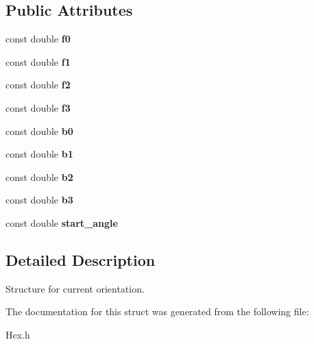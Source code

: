 \subsection*{Public Attributes}
\begin{DoxyCompactItemize}
\item 
const double {\bfseries f0}\hypertarget{structOrientation_a6c479a9d50fc45541efd9f6c4a1d8292}{}\label{structOrientation_a6c479a9d50fc45541efd9f6c4a1d8292}

\item 
const double {\bfseries f1}\hypertarget{structOrientation_adc042593ae940380549d3daab099f47f}{}\label{structOrientation_adc042593ae940380549d3daab099f47f}

\item 
const double {\bfseries f2}\hypertarget{structOrientation_ab1d8393081530c13b5b9f8abbb74bcf1}{}\label{structOrientation_ab1d8393081530c13b5b9f8abbb74bcf1}

\item 
const double {\bfseries f3}\hypertarget{structOrientation_a3bad5d4cb5d8ad5bf831e0da4e9a5393}{}\label{structOrientation_a3bad5d4cb5d8ad5bf831e0da4e9a5393}

\item 
const double {\bfseries b0}\hypertarget{structOrientation_a00fa64524c85e578242ff570ec1af296}{}\label{structOrientation_a00fa64524c85e578242ff570ec1af296}

\item 
const double {\bfseries b1}\hypertarget{structOrientation_a6a689412f9364145e76915cf22e09e23}{}\label{structOrientation_a6a689412f9364145e76915cf22e09e23}

\item 
const double {\bfseries b2}\hypertarget{structOrientation_a6a7dc6148e4aa540e911941ad84d3860}{}\label{structOrientation_a6a7dc6148e4aa540e911941ad84d3860}

\item 
const double {\bfseries b3}\hypertarget{structOrientation_a542a63f9305a118e4bde11b9793da46b}{}\label{structOrientation_a542a63f9305a118e4bde11b9793da46b}

\item 
const double {\bfseries start\+\_\+angle}\hypertarget{structOrientation_ab5d081ee42e1b109e123a836fb85c383}{}\label{structOrientation_ab5d081ee42e1b109e123a836fb85c383}

\end{DoxyCompactItemize}


\subsection{Detailed Description}
Structure for current orientation. 

The documentation for this struct was generated from the following file\+:\begin{DoxyCompactItemize}
\item 
Hex.\+h\end{DoxyCompactItemize}
